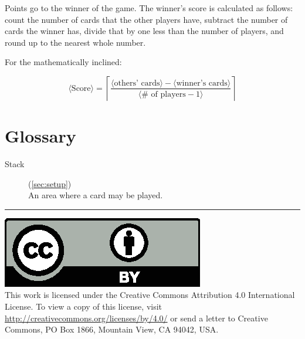 \documentclass{article}
\begin{document}
Points go to the winner of the game. The winner's score is calculated as follows: count the number of cards that the other players have, subtract the number of cards the winner has, divide that by one less than the number of players, and round up to the nearest whole number.

For the mathematically inclined:

$$
\langle\textrm{Score}\rangle = \left\lceil\frac{\langle\textrm{others'\ cards}\rangle - \langle\textrm{winner's\ cards}\rangle}{\langle\textrm{\#\ of\ players} - 1\rangle}\right\rceil
$$

\section{Glossary}
\begin{description}
  \item[Stack] (\autoref{sec:setup})\\
    An area where a card may be played.
\end{description}

\medskip
\hrule

{
  \small
  \includegraphics[scale=0.5]{cc-by.eps}\\
  This work is licensed under the Creative Commons Attribution 4.0
  International License. To view a copy of this license, visit
  \url{http://creativecommons.org/licenses/by/4.0/} or send a letter to Creative Commons, PO Box 1866, Mountain View, CA 94042, USA.
}
\end{document}
